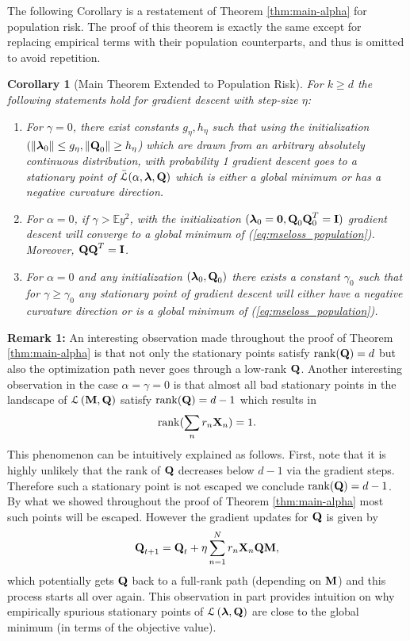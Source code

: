 \documentclass[11pt]{article}
\theoremstyle{plain}
\newtheorem{corollary}{Corollary}
\DeclareMathOperator*{\rank}{rank}
\DeclareMathOperator*{\lmq}{\ensuremath{\mathcal{L} \left(\Mx{M},\Mx{Q}\right) }}
\DeclareMathOperator*{\llq}{\ensuremath{\mathcal{L} \left(\V{\lambda},\Mx{Q}\right)} }
\theoremstyle{plain}
\numberwithin{equation}{section}
\numberwithin{lemma}{section}
\numberwithin{theorem}{section}
\numberwithin{corollary}{section}
\numberwithin{observation}{section}
\numberwithin{definition}{section}
\numberwithin{example}{section}
\begin{document}
The following Corollary is a restatement of Theorem \ref{thm:main-alpha} for population risk. The proof of this theorem is exactly the same except for replacing empirical terms with their population counterparts, and thus is omitted to avoid repetition.
\begin{corollary} [Main Theorem Extended to Population Risk] \label{thm:main-alpha-population} For $k \geq d$ the following statements hold for gradient descent with step-size $\eta$: 
\begin{enumerate}
    \item For $\gamma = 0$, there exist constants $g_\eta, h_\eta$ such that using the initialization $(\|\V{\lambda}_0\| \leq g_{\eta},\|\Mx{Q}_0\| \geq h_{\eta}$) which are drawn from an arbitrary absolutely continuous distribution, with probability 1 gradient descent goes to a stationary point of $\Bar{\mathcal{L}}(\alpha,\V{\lambda},\Mx{Q})$ which is either a global minimum or has a negative curvature direction.
    \item For $\alpha = 0$, if $\gamma > \mathbb{E}y^2$, with the initialization $(\V{\lambda}_0 = \V{0},\Mx{Q}_0\Mx{Q}_0^T = \Mx{I})$ gradient descent will converge to a global minimum of (\ref{eq:mseloss_population}). Moreover, $\Mx{Q}\Mx{Q}^T = \Mx{I}$.
    \item For $\alpha = 0$ and any initialization $(\V{\lambda}_0,\Mx{Q}_0)$ there exists a constant $\gamma_{0}$ such that for $\gamma \geq \gamma_0$ any stationary point of gradient descent will either have a negative curvature direction or is a global minimum of (\ref{eq:mseloss_population}). 
\end{enumerate}
\end{corollary}


\textbf{Remark 1:} An interesting observation made throughout the proof of Theorem \ref{thm:main-alpha} is that not only the stationary points satisfy $\rank(\Mx{Q}) = d$ but also the optimization path never goes through a low-rank $\Mx{Q}$.  Another interesting observation in the case $\alpha = \gamma = 0$ is that almost all bad stationary points  in the landscape of $\lmq$ satisfy $\rank(\Mx{Q}) = d-1$ which results in
\[
\rank(\sum_{n}r_n \Mx{X}_n) = 1.
\] 
This phenomenon can be intuitively explained as follows. First, note that it is highly unlikely that the rank of $\Mx{Q}$ decreases below $d-1$ via the gradient steps. Therefore such a stationary point is not escaped we conclude $\rank(\Mx{Q}) = d-1$. By what we showed throughout the proof of Theorem \ref{thm:main-alpha} most such points will be escaped. However the gradient updates for $\Mx{Q}$ is given by 
\[
\Mx{Q}_{t+1} = \Mx{Q}_t + \eta \sum_{n=1}^N r_n \Mx{X}_n \Mx{QM},
\]
which potentially gets $\Mx{Q}$ back to a full-rank path (depending on $\Mx{M}$) and this process starts all over again. This observation in part provides intuition on why empirically spurious stationary points of $\llq$ are close to the global minimum (in terms of the objective value).
\end{document}
